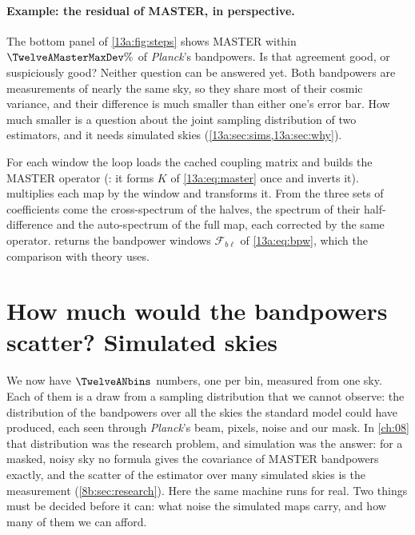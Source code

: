 \paragraph{Example: the residual of MASTER, in perspective.} The bottom panel of \cref{13a:fig:steps} shows MASTER
within $\TwelveAMasterMaxDev\%$ of \textit{Planck}'s bandpowers. Is that agreement good, or suspiciously good?
Neither question can be answered yet. Both bandpowers are measurements of nearly the same sky, so they share
most of their cosmic variance, and their difference is much smaller than either one's error bar. How much
smaller is a question about the joint sampling distribution of two estimators, and it needs simulated skies
(\cref{13a:sec:sims,13a:sec:why}).


\noindent For each window the loop loads the cached coupling matrix and builds the MASTER operator
(: it forms $K$ of \eqref{13a:eq:master} once and inverts it).  multiplies each map
by the window and transforms it. From the three sets of coefficients come the cross-spectrum of the halves, the
spectrum of their half-difference and the auto-spectrum of the full map, each corrected by the same operator.
 returns the bandpower windows $\mathcal F_{b\ell}$ of \eqref{13a:eq:bpw}, which the
comparison with theory uses.
\section{How much would the bandpowers scatter? Simulated skies}
\label{13a:sec:sims}

We now have $\TwelveANbins$ numbers, one per bin, measured from one sky. Each of them is a draw from a sampling
distribution that we cannot observe: the distribution of the bandpowers over all the skies the standard model
could have produced, each seen through \textit{Planck}'s beam, pixels, noise and our mask. In \cref{ch:08}
that distribution was the research problem, and simulation was the answer: for a masked, noisy sky no formula
gives the covariance of MASTER bandpowers exactly, and the scatter of the estimator over many simulated skies
is the measurement (\cref{8b:sec:research}). Here the same machine runs for real. Two things must be decided
before it can: what noise the simulated maps carry, and how many of them we can afford.

